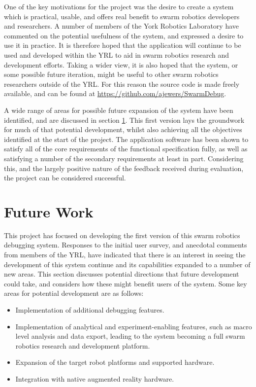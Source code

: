 One of the key motivations for the project was the desire to create a system which is practical, usable, and offers real benefit to swarm robotics developers and researchers. A number of members of the York Robotics Laboratory have commented on the potential usefulness of the system, and expressed a desire to use it in practice. It is therefore hoped that the application will continue to be used and developed within the YRL to aid in swarm robotics research and development efforts. Taking a wider view, it is also hoped that the system, or some possible future iteration, might be useful to other swarm robotics researchers outside of the YRL. For this reason the source code is made freely available, and can be found at \url{https://github.com/ajewers/SwarmDebug}.

A wide range of areas for possible future expansion of the system have been identified, and are discussed in section \ref{FutureWork}. This first version lays the groundwork for much of that potential development, whilst also achieving all the objectives identified at the start of the project. The application software has been shown to satisfy all of the core requirements of the functional specification fully, as well as satisfying a number of the secondary requirements at least in part. Considering this, and the largely positive nature of the feedback received during evaluation, the project can be considered successful.


\section{Future Work} \label{FutureWork}

This project has focused on developing the first version of this swarm robotics debugging system. Responses to the initial user survey, and anecdotal comments from members of the YRL, have indicated that there is an interest in seeing the development of this system continue and its capabilities expanded to a number of new areas. This section discusses potential directions that future development could take, and considers how these might benefit users of the system. Some key areas for potential development are as follows:

\begin{itemize}
 \item Implementation of additional debugging features.
 \item Implementation of analytical and experiment-enabling features, such as macro level analysis and data export, leading to the system becoming a full swarm robotics research and development platform.
 \item Expansion of the target robot platforms and supported hardware.
 \item Integration with native augmented reality hardware.
\end{itemize}

